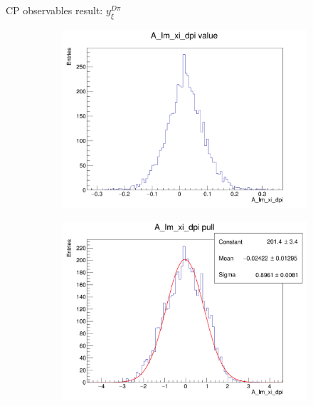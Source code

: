 \documentclass{beamer}
\begin{document}
\begin{frame}{CP observables result: $y_\xi^{D\pi}$}
  \begin{figure}
    \centering
    \begin{subfigure}{0.42\textwidth}
      \includegraphics[width = 1.0\textwidth]{Plots/A_Im_xi_dpi_value.png}
    \end{subfigure}
    \begin{subfigure}{0.42\textwidth}
      \includegraphics[width = 1.0\textwidth]{Plots/A_Im_xi_dpi_pull.png}
    \end{subfigure}%
    \begin{subfigure}{0.42\textwidth}

\end{subfigure}
\end{figure}
\end{frame}
\end{document}
